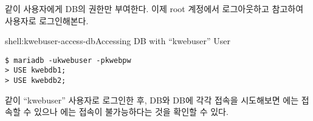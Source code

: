 \와 같이  사용자에게  DB의 권한만 부여한다. 이제 root 계정에서 로그아웃하고 \을 참고하여  사용자로 로그인해본다.

\begin{shell}{shell:kwebuser-access-db}{Accessing DB with ``kwebuser'' User}
\begin{verbatim}
$ mariadb -ukwebuser -pkwebpw
> USE kwebdb1;
> USE kwebdb2;
\end{verbatim}
\end{shell}

\와 같이 ``kwebuser'' 사용자로 로그인한 후,  DB와  DB에 각각 접속을 시도해보면 에는 접속할 수 있으나 에는 접속이 불가능하다는 것을 확인할 수 있다.
